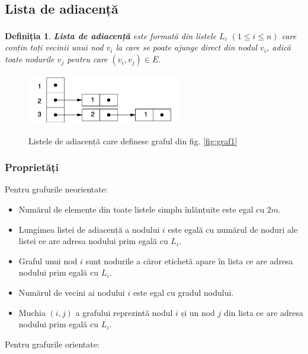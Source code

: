 \documentclass[9pt,a4paper]{report}
\newtheorem{definitie}{Definiția}
\begin{document}
\subsection{Lista de adiacență}

\begin{definitie}
    \textbf{Lista de adiacență}\textsuperscript{\cite{milosescu}} este formată din listele $L_i$ $(1 \leq i \leq n)$ care conțin toți vecinii unui nod $v_i$ la care se poate ajunge direct din nodul $v_i$, adică toate nodurile $v_j$ pentru care $(v_i, v_j) \in E$.
\end{definitie}

\begin{figure}[htbp]
    \centering
    \includegraphics[width=0.6\textwidth]{img/adjacency_lists.png}
    \label{fig:graf3}
    \caption{Listele de adiacență care definesc graful din fig. \ref{fig:graf1}}
\end{figure}

\subsubsection*{Proprietăți}

Pentru grafurile neorientate:

\begin{itemize}
    \item Numărul de elemente din toate listele simplu înlănțuite este egal cu $2m$.
    \item Lungimea listei de adiacență a nodului $i$ este egală cu numărul de noduri ale listei ce are adresa nodului prim egală cu $L_i$.
    \item Graful unui nod $i$ sunt nodurile a căror etichetă apare în lista ce are adresa nodului prim egală cu $L_i$.
    \item Numărul de vecini ai nodului $i$ este egal cu gradul nodului.
    \item Muchia $(i,j)$ a grafului reprezintă nodul $i$ și un nod $j$ din lista ce are adresa nodului prim egală cu $L_i$.
\end{itemize}

Pentru grafurile orientate:
\end{document}
